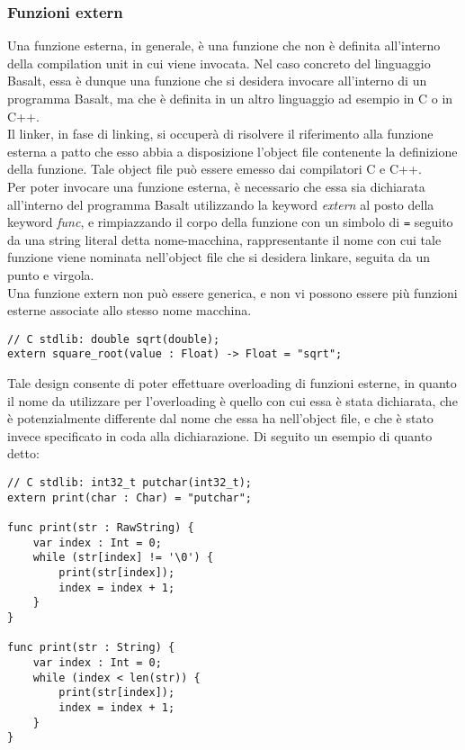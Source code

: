 \subsubsection{Funzioni extern}
Una funzione esterna, in generale, è una funzione che non è definita all'interno della compilation unit in cui viene 
invocata. Nel caso concreto del linguaggio Basalt, essa è dunque una funzione che si desidera invocare all'interno
di un programma Basalt, ma che è definita in un altro linguaggio ad esempio in C o in C++. \\

Il linker, in fase di linking, si occuperà di risolvere il riferimento alla funzione esterna a patto che 
esso abbia a disposizione l'object file contenente la definizione della funzione. Tale object file può 
essere emesso dai compilatori C e C++. \\

Per poter invocare una funzione esterna, è necessario che essa sia dichiarata all'interno del programma Basalt
utilizzando la keyword \textit{extern} al posto della keyword \textit{func}, e rimpiazzando il corpo della funzione
con un simbolo di \texttt{=} seguito da una string literal detta nome-macchina, rappresentante il nome con cui tale 
funzione viene nominata nell'object file che si desidera linkare, seguita da un punto e virgola. \\

Una funzione extern non può essere generica, e non vi possono essere più funzioni esterne associate 
allo stesso nome macchina. \\

\vspace{0.4cm}
\begin{lstlisting}[frame=single]
// C stdlib: double sqrt(double);
extern square_root(value : Float) -> Float = "sqrt";
\end{lstlisting}
\vspace{0.4cm}

Tale design consente di poter effettuare overloading di funzioni esterne, in quanto il nome da utilizzare per
l'overloading è quello con cui essa è stata dichiarata, che è potenzialmente differente dal nome che essa ha
nell'object file, e che è stato invece specificato in coda alla dichiarazione. Di seguito un esempio di quanto detto: \\

\vspace{0.4cm}
\begin{lstlisting}[frame=single]
// C stdlib: int32_t putchar(int32_t);
extern print(char : Char) = "putchar";

func print(str : RawString) {
    var index : Int = 0;
    while (str[index] != '\0') {
        print(str[index]);
        index = index + 1;
    }
}

func print(str : String) {
    var index : Int = 0;
    while (index < len(str)) {
        print(str[index]);
        index = index + 1;
    }
}
\end{lstlisting}
